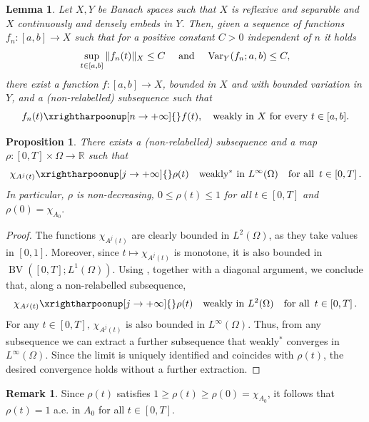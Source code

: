 \documentclass[a4paper,11pt,reqno]{amsart}
\numberwithin{equation}{section}
\newtheorem{prop}[teo]{Proposition}
\newtheorem{lemma}[teo]{Lemma}
\theoremstyle{definition}
\newtheorem{remark}[teo]{Remark}
\theoremstyle{remark}
\renewcommand{\r}{\mathbb{R}}
\DeclareMathOperator{\BV}{BV}
\begin{document}
\begin{lemma}\label{helly}
	Let $X,Y$ be Banach spaces such that $X$ is reflexive and separable and $X$ continuously and densely embeds in $Y$. Then, given a sequence of functions $f_n\colon [a,b]\to X$ such that for a positive constant $C>0$ independent of $n$ it holds
	\begin{equation}
		\sup\limits_{t\in [a,b]}\|f_n(t)\|_X\le C\quad\text{ and }\quad {\rm Var}_Y(f_n;a,b)\le C,
	\end{equation}
 	there exist a function $f\colon [a,b]\to X$, bounded in $X$ and with bounded variation in $Y$, and a (non-relabelled) subsequence such that
\begin{equation}\label{weakconvhelly}
	f_n(t)\xrightharpoonup[n\to +\infty]{}f(t),\quad\text{weakly in $X$ for every }t\in [a,b].
\end{equation}
\end{lemma}
\begin{prop}\label{prop:rho}
    There exists a (non-relabelled) subsequence and a map $\rho\colon [0,T]\times\Omega\to \r$ such that 
    \begin{equation}
        \chi_{A^{j}(t)} \xrightharpoonup[j\to +\infty]{} \rho(t) \quad \text{weakly$^\ast$ in } L^\infty(\Omega) \quad \text{for all } \, t \in [0, T] \,.
    \end{equation}
    In particular, $\rho$ is non-decreasing, $0\leq \rho(t)\leq 1$ for all $t \in [0, T]$ and $\rho(0)=\chi_{A_0}.$
\end{prop}

\begin{proof}
    The functions $\chi_{A^j(t)}$ are clearly bounded in $L^2(\Omega)$, as they take values in $[0,1]$. Moreover, since $t\mapsto \chi_{A^j(t)}$ is monotone, it is also bounded in $\BV([0,T];L^1(\Omega))$. Using , together with a diagonal argument, we conclude that, along a non-relabelled subsequence,
    \begin{equation}
        \chi_{A^{j}(t)} \xrightharpoonup[j\to +\infty]{} \rho(t) \quad \text{weakly in } L^2(\Omega) \quad \text{for all } \, t \in [0, T] \,.
    \end{equation}
    For any $t\in[0,T],\,\chi_{A^j(t)}$ is also bounded in $L^\infty(\Omega)$. Thus, from any subsequence we can extract a further subsequence that weakly$^*$ converges in $L^\infty(\Omega)$.
    Since the limit is uniquely identified and coincides with $ \rho(t) $, the desired convergence holds without a further extraction.
\end{proof}
\begin{remark}
    Since $\rho(t)$ satisfies $1\geq \rho(t)\geq \rho(0)=\chi_{A_0}$, it follows that $\rho(t)=1$ a.e. in $A_0$ for all $t\in [0,T]$.
\end{remark}
\end{document}
